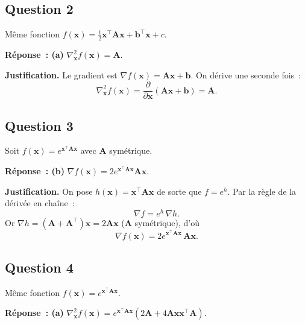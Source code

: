 \documentclass[12pt,letterpaper]{article}
\begin{document}
\subsection{Question 2}

Même fonction $f(\mathbf{x}) = \frac{1}{2}\mathbf{x}^\top \mathbf{A}\mathbf{x} + \mathbf{b}^\top\mathbf{x} + c$.

\textbf{Réponse~: (a)} $\nabla^2_{\mathbf{x}} f(\mathbf{x}) = \mathbf{A}$.

\textbf{Justification.}
Le gradient est $\nabla f(\mathbf{x}) = \mathbf{A}\mathbf{x} + \mathbf{b}$. On dérive une seconde fois~:
\[
\nabla^2_{\mathbf{x}} f(\mathbf{x}) = \frac{\partial}{\partial \mathbf{x}}(\mathbf{A}\mathbf{x} + \mathbf{b}) = \boxed{\mathbf{A}}.
\]

\subsection{Question 3}

Soit $f(\mathbf{x}) = e^{\mathbf{x}^\top\mathbf{A}\mathbf{x}}$ avec $\mathbf{A}$ symétrique.

\textbf{Réponse~: (b)} $\nabla f(\mathbf{x}) = 2e^{\mathbf{x}^\top\mathbf{A}\mathbf{x}}\mathbf{A}\mathbf{x}$.

\textbf{Justification.}
On pose $h(\mathbf{x}) = \mathbf{x}^\top\mathbf{A}\mathbf{x}$ de sorte que $f = e^{h}$. Par la règle de la dérivée en chaîne~:
\[
\nabla f = e^{h}\,\nabla h.
\]
Or $\nabla h = (\mathbf{A}+\mathbf{A}^\top)\mathbf{x} = 2\mathbf{A}\mathbf{x}$ ($\mathbf{A}$ symétrique), d'où
\[
\nabla f(\mathbf{x}) = \boxed{2e^{\mathbf{x}^\top\mathbf{A}\mathbf{x}}\,\mathbf{A}\mathbf{x}}.
\]

\subsection{Question 4}

Même fonction $f(\mathbf{x}) = e^{\mathbf{x}^\top\mathbf{A}\mathbf{x}}$.

\textbf{Réponse~: (a)} $\nabla^2_{\mathbf{x}} f(\mathbf{x}) = e^{\mathbf{x}^\top\mathbf{A}\mathbf{x}}(2\mathbf{A} + 4\mathbf{A}\mathbf{x}\mathbf{x}^\top\mathbf{A})$.
\end{document}
